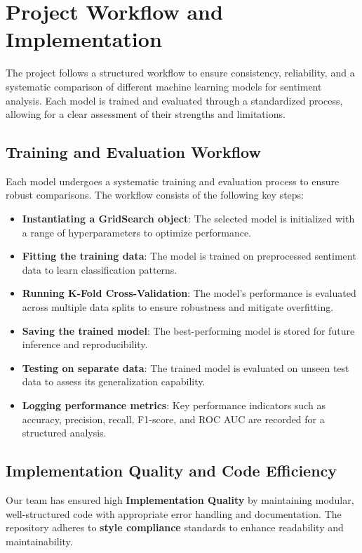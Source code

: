 \section{Project Workflow and Implementation}

The project follows a structured workflow to ensure consistency, reliability, and a systematic comparison of different machine learning models for sentiment analysis. Each model is trained and evaluated through a standardized process, allowing for a clear assessment of their strengths and limitations.

\subsection{Training and Evaluation Workflow}

Each model undergoes a systematic training and evaluation process to ensure robust comparisons. The workflow consists of the following key steps:

\begin{itemize}
    \item \textbf{Instantiating a GridSearch object}: The selected model is initialized with a range of hyperparameters to optimize performance.
    \item \textbf{Fitting the training data}: The model is trained on preprocessed sentiment data to learn classification patterns.
    \item \textbf{Running K-Fold Cross-Validation}: The model’s performance is evaluated across multiple data splits to ensure robustness and mitigate overfitting.
    \item \textbf{Saving the trained model}: The best-performing model is stored for future inference and reproducibility.
    \item \textbf{Testing on separate data}: The trained model is evaluated on unseen test data to assess its generalization capability.
    \item \textbf{Logging performance metrics}: Key performance indicators such as accuracy, precision, recall, F1-score, and ROC AUC are recorded for a structured analysis.
\end{itemize}

\subsection{Implementation Quality and Code Efficiency}

Our team has ensured high \textbf{Implementation Quality} by maintaining modular, well-structured code with appropriate error handling and documentation. The repository adheres to \textbf{style compliance} standards to enhance readability and maintainability.

